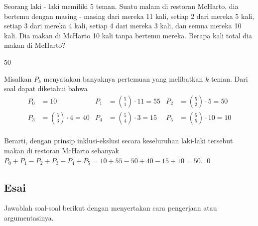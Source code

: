 \documentclass[11pt]{scrartcl}
\begin{document}
	\vspace{10pt}
	\begin{soalbaru}
		Seorang laki - laki memiliki 5 teman. Suatu malam di restoran McHarto, dia bertemu
		dengan masing - masing dari mereka 11 kali, setiap 2 dari mereka 5 kali, setiap 3 dari mereka 4 kali, setiap 4 dari mereka 3 kali, dan semua mereka 10 kali. Dia makan di McHarto 10 kali tanpa bertemu mereka. Berapa kali total dia makan di McHarto?
		\begin{jawaban}
			50
		\end{jawaban}
		\begin{solusi}
		Misalkan $P_k$ menyatakan banyaknya pertemuan yang melibatkan $k$ teman. Dari soal dapat diketahui bahwa \\[-25pt]
		\begin{align*}
		P_0 &= 10 & P_1 &= {5 \choose 1}\cdot 11=55 & P_2 &= {5 \choose 2}\cdot 5=50\\
		P_3 &= {5 \choose 3}\cdot 4=40 & P_4 &= {5 \choose 4}\cdot 3=15 & P_5 &= {5 \choose 5}\cdot 10 = 10
		\end{align*}\\[-20pt]
		Berarti, dengan prinsip inklusi-ekslusi secara keseluruhan laki-laki tersebut makan di restoran McHarto sebanyak $P_0+P_1-P_2+P_3-P_4+P_5 = 10 + 55 - 50 + 40 - 15 + 10=50.$ \qed
		\end{solusi}
		
		
	\end{soalbaru}
\newpage
\subsection{Esai}
Jawablah soal-soal berikut dengan menyertakan cara pengerjaan atau argumentasinya.
	
\end{document}
